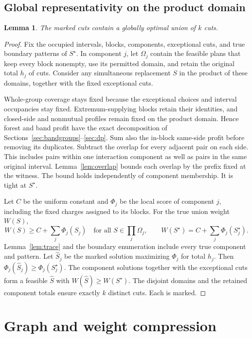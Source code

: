 \documentclass[10pt,letterpaper]{article}
\newtheorem{lemma}{Lemma}
\begin{document}
\subsection{Global representativity on the product domain}
\begin{lemma}\label{lem:representativity}
The marked cuts contain a globally optimal union of \(k\) cuts.
\end{lemma}
\begin{proof}
Fix the occupied intervals, blocks, components, exceptional cuts, and true boundary patterns of \(S^\star\). In component \(j\), let \(\Omega_j\) contain the feasible plans that keep every block nonempty, use its permitted domain, and retain the original total \(h_j\) of cuts. Consider any simultaneous replacement \(S\) in the product of these domains, together with the fixed exceptional cuts.

Whole-group coverage stays fixed because the exceptional choices and interval occupancies stay fixed. Extremum-supplying blocks retain their identities, and closed-side and nonmutual profiles remain fixed on the product domain. Hence forest and band profit have the exact decomposition of Sections~\ref{sec:bandgroups}--\ref{sec:dp}. Sum also the in-block same-side profit before removing its duplicates. Subtract the overlap for every adjacent pair on each side. This includes pairs within one interaction component as well as pairs in the same original interval. Lemma~\ref{lem:overlap} bounds each overlap by the prefix fixed at the witness. The bound holds independently of component membership. It is tight at \(S^\star\).

Let \(C\) be the uniform constant and \(\Phi_j\) be the local score of component \(j\), including the fixed charges assigned to its blocks. For the true union weight \(W(S)\),
\[
 W(S)\ge C+\sum_j\Phi_j(S_j)\quad\text{for all }S\in\prod_j\Omega_j,
 \qquad
 W(S^\star)=C+\sum_j\Phi_j(S^\star_j).
\]
Lemma~\ref{lem:trace} and the boundary enumeration include every true component and pattern. Let \(\widehat S_j\) be the marked solution maximizing \(\Phi_j\) for total \(h_j\). Then \(\Phi_j(\widehat S_j)\ge\Phi_j(S_j^\star)\). The component solutions together with the exceptional cuts form a feasible \(\widehat S\) with \(W(\widehat S)\ge W(S^\star)\). The disjoint domains and the retained component totals ensure exactly \(k\) distinct cuts. Each is marked.
\end{proof}

\section{Graph and weight compression}
\end{document}
